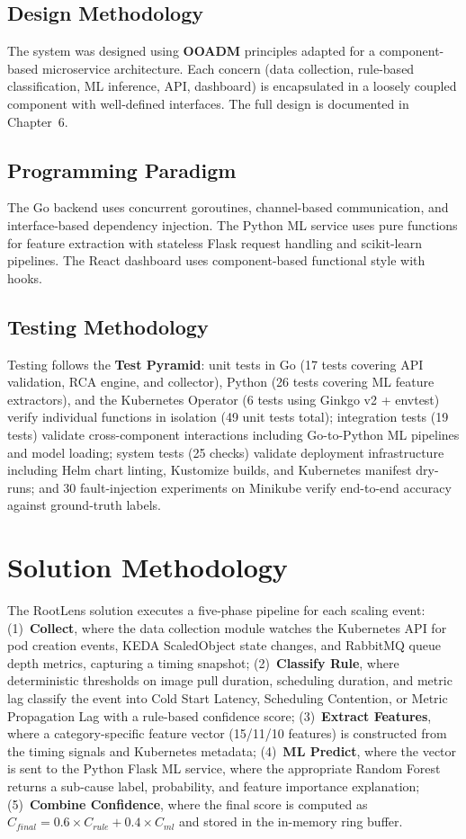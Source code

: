 \subsection{Design Methodology}
The system was designed using \textbf{OOADM} principles adapted for a component-based microservice architecture. Each concern (data collection, rule-based classification, ML inference, API, dashboard) is encapsulated in a loosely coupled component with well-defined interfaces. The full design is documented in Chapter~6.

\subsection{Programming Paradigm}
The Go backend uses concurrent goroutines, channel-based communication, and interface-based dependency injection. The Python ML service uses pure functions for feature extraction with stateless Flask request handling and scikit-learn pipelines. The React dashboard uses component-based functional style with hooks.

\subsection{Testing Methodology}
Testing follows the \textbf{Test Pyramid}: unit tests in Go (17 tests covering API validation, RCA engine, and collector), Python (26 tests covering ML feature extractors), and the Kubernetes Operator (6 tests using Ginkgo v2 + envtest) verify individual functions in isolation (49 unit tests total); integration tests (19 tests) validate cross-component interactions including Go-to-Python ML pipelines and model loading; system tests (25 checks) validate deployment infrastructure including Helm chart linting, Kustomize builds, and Kubernetes manifest dry-runs; and 30 fault-injection experiments on Minikube verify end-to-end accuracy against ground-truth labels.

\section{Solution Methodology}
The RootLens solution executes a five-phase pipeline for each scaling event: (1)~\textbf{Collect}, where the data collection module watches the Kubernetes API for pod creation events, KEDA ScaledObject state changes, and RabbitMQ queue depth metrics, capturing a timing snapshot; (2)~\textbf{Classify Rule}, where deterministic thresholds on image pull duration, scheduling duration, and metric lag classify the event into Cold Start Latency, Scheduling Contention, or Metric Propagation Lag with a rule-based confidence score; (3)~\textbf{Extract Features}, where a category-specific feature vector (15/11/10 features) is constructed from the timing signals and Kubernetes metadata; (4)~\textbf{ML Predict}, where the vector is sent to the Python Flask ML service, where the appropriate Random Forest returns a sub-cause label, probability, and feature importance explanation; (5)~\textbf{Combine Confidence}, where the final score is computed as $C_{final} = 0.6 \times C_{rule} + 0.4 \times C_{ml}$ and stored in the in-memory ring buffer.

